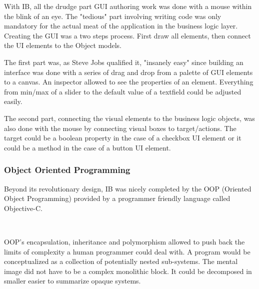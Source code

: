 \vspace{-4mm}
 With IB, all the drudge part GUI authoring work was done with a mouse within the blink of an eye. The "tedious" part involving writing code was only mandatory for the actual meat of the application in the business logic layer. Creating the GUI was a two steps process. First draw all elements, then connect the UI elements to the Object models.\\
\par
The first part was, as Steve Jobs qualified it, "insanely easy" since building an interface was done with a series of drag and drop from a palette of GUI elements to a canvas. An inspector allowed to see the properties of an element. Everything from min/max of a slider to the default value of a textfield could be adjusted easily.\\
\par
The second part, connecting the visual elements to the business logic objects, was also done with the mouse by connecting visual boxes to target/actions. The target could be a boolean property in the case of a checkbox UI element or it could be a method in the case of a button UI element.

\subsubsection{Object Oriented Programming}
Beyond its revolutionary design, IB was nicely completed by the OOP (Oriented Object Programming) provided by a programmer friendly language called Objective-C.\\
\par
{}\\
\par
OOP's encapsulation, inheritance and polymorphism allowed to push back the limits of complexity a human programmer could deal with. A program would be conceptualized as a collection of potentially nested sub-systems. The mental image did not have to be a complex monolithic block. It could be decomposed in smaller easier to summarize opaque systems.\\

